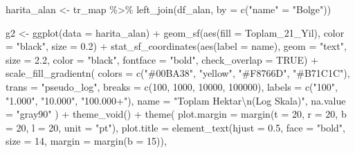 \documentclass[
  11pt,
  a4paper,
  DIV=11,
  numbers=noendperiod]{scrartcl}
\newenvironment{Shaded}{\begin{snugshade}}{\end{snugshade}}
\newcommand{\AttributeTok}[1]{\textcolor[rgb]{0.40,0.45,0.13}{#1}}
\newcommand{\ConstantTok}[1]{\textcolor[rgb]{0.56,0.35,0.01}{#1}}
\newcommand{\DecValTok}[1]{\textcolor[rgb]{0.68,0.00,0.00}{#1}}
\newcommand{\FloatTok}[1]{\textcolor[rgb]{0.68,0.00,0.00}{#1}}
\newcommand{\FunctionTok}[1]{\textcolor[rgb]{0.28,0.35,0.67}{#1}}
\newcommand{\NormalTok}[1]{\textcolor[rgb]{0.00,0.23,0.31}{#1}}
\newcommand{\OtherTok}[1]{\textcolor[rgb]{0.00,0.23,0.31}{#1}}
\newcommand{\SpecialCharTok}[1]{\textcolor[rgb]{0.37,0.37,0.37}{#1}}
\newcommand{\StringTok}[1]{\textcolor[rgb]{0.13,0.47,0.30}{#1}}
\begin{document}
\begin{Shaded}
\begin{Highlighting}[]
\NormalTok{harita\_alan }\OtherTok{\textless{}{-}}\NormalTok{ tr\_map }\SpecialCharTok{\%\textgreater{}\%} \FunctionTok{left\_join}\NormalTok{(df\_alan, }\AttributeTok{by =} \FunctionTok{c}\NormalTok{(}\StringTok{"name"} \OtherTok{=} \StringTok{"Bolge"}\NormalTok{))}

\NormalTok{g2 }\OtherTok{\textless{}{-}} \FunctionTok{ggplot}\NormalTok{(}\AttributeTok{data =}\NormalTok{ harita\_alan) }\SpecialCharTok{+}
  \FunctionTok{geom\_sf}\NormalTok{(}\FunctionTok{aes}\NormalTok{(}\AttributeTok{fill =}\NormalTok{ Toplam\_21\_Yil), }\AttributeTok{color =} \StringTok{"black"}\NormalTok{, }\AttributeTok{size =} \FloatTok{0.2}\NormalTok{) }\SpecialCharTok{+}
  \FunctionTok{stat\_sf\_coordinates}\NormalTok{(}\FunctionTok{aes}\NormalTok{(}\AttributeTok{label =}\NormalTok{ name), }\AttributeTok{geom =} \StringTok{"text"}\NormalTok{, }\AttributeTok{size =} \FloatTok{2.2}\NormalTok{, }\AttributeTok{color =} \StringTok{"black"}\NormalTok{, }\AttributeTok{fontface =} \StringTok{"bold"}\NormalTok{, }\AttributeTok{check\_overlap =} \ConstantTok{TRUE}\NormalTok{) }\SpecialCharTok{+}
  \FunctionTok{scale\_fill\_gradientn}\NormalTok{(}
    \AttributeTok{colors =} \FunctionTok{c}\NormalTok{(}\StringTok{"\#00BA38"}\NormalTok{, }\StringTok{"yellow"}\NormalTok{, }\StringTok{"\#F8766D"}\NormalTok{, }\StringTok{"\#B71C1C"}\NormalTok{), }
    \AttributeTok{trans =} \StringTok{"pseudo\_log"}\NormalTok{, }
    \AttributeTok{breaks =} \FunctionTok{c}\NormalTok{(}\DecValTok{100}\NormalTok{, }\DecValTok{1000}\NormalTok{, }\DecValTok{10000}\NormalTok{, }\DecValTok{100000}\NormalTok{), }
    \AttributeTok{labels =} \FunctionTok{c}\NormalTok{(}\StringTok{"100"}\NormalTok{, }\StringTok{"1.000"}\NormalTok{, }\StringTok{"10.000"}\NormalTok{, }\StringTok{"100.000+"}\NormalTok{), }
    \AttributeTok{name =} \StringTok{"Toplam Hektar}\SpecialCharTok{\textbackslash{}n}\StringTok{(Log Skala)"}\NormalTok{, }
    \AttributeTok{na.value =} \StringTok{"gray90"}
\NormalTok{  ) }\SpecialCharTok{+}
  \FunctionTok{theme\_void}\NormalTok{() }\SpecialCharTok{+}
  \FunctionTok{theme}\NormalTok{(}
    \AttributeTok{plot.margin =} \FunctionTok{margin}\NormalTok{(}\AttributeTok{t =} \DecValTok{20}\NormalTok{, }\AttributeTok{r =} \DecValTok{20}\NormalTok{, }\AttributeTok{b =} \DecValTok{20}\NormalTok{, }\AttributeTok{l =} \DecValTok{20}\NormalTok{, }\AttributeTok{unit =} \StringTok{"pt"}\NormalTok{), }
    \AttributeTok{plot.title =} \FunctionTok{element\_text}\NormalTok{(}\AttributeTok{hjust =} \FloatTok{0.5}\NormalTok{, }\AttributeTok{face =} \StringTok{"bold"}\NormalTok{, }\AttributeTok{size =} \DecValTok{14}\NormalTok{, }\AttributeTok{margin =} \FunctionTok{margin}\NormalTok{(}\AttributeTok{b =} \DecValTok{15}\NormalTok{)), }

\end{Highlighting}
\end{Shaded}
\end{document}
